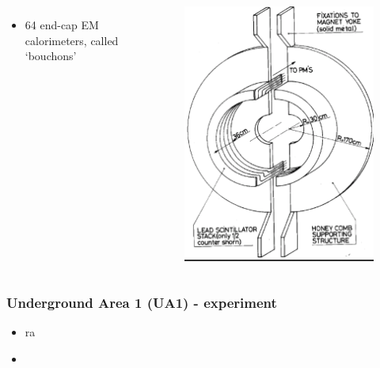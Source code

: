 \documentclass[xcolor=table]{beamer}
\begin{document}
\begin{frame}
\begin{columns}
\begin{itemize}
\item 64 end-cap EM calorimeters, called `bouchons'
\end{itemize}
\begin{figure}[h]
\centering
\includegraphics[height=0.65\textheight]{images/bouchon.png}
\end{figure}

\end{columns}

\end{frame}

\begin{frame}
\frametitle{Underground Area 1 (UA1) - experiment}

\begin{itemize}
\item ra
\item 
\end{itemize}


\end{frame}
\end{document}
